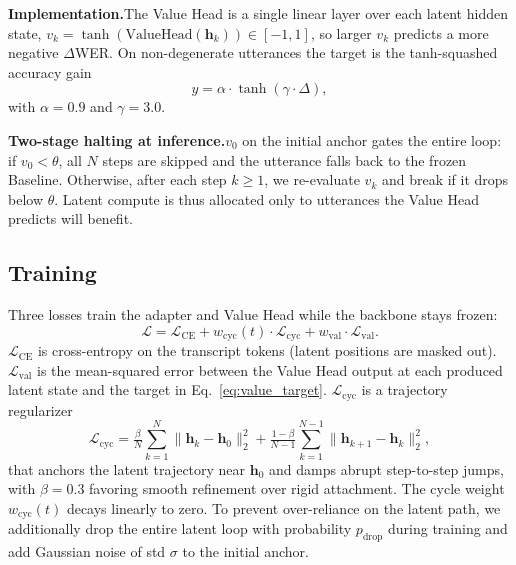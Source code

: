 \documentclass[a4paper]{article}
\begin{document}
\textbf{Implementation.}\quad The Value Head is a single linear layer over each latent hidden state, $v_k = \tanh(\text{ValueHead}(\mathbf{h}_k)) \in [-1, 1]$, so larger $v_k$ predicts a more negative $\Delta$WER. On non-degenerate utterances the target is the tanh-squashed accuracy gain
\begin{equation}
    y = \alpha \cdot \tanh(\gamma \cdot \Delta),
    \label{eq:value_target}
\end{equation}
with $\alpha{=}0.9$ and $\gamma{=}3.0$.

\textbf{Two-stage halting at inference.}\quad $v_0$ on the initial anchor gates the entire loop: if $v_0 < \theta$, all $N$ steps are skipped and the utterance falls back to the frozen Baseline. Otherwise, after each step $k\geq 1$, we re-evaluate $v_k$ and break if it drops below $\theta$. Latent compute is thus allocated only to utterances the Value Head predicts will benefit.

\subsection{Training}
\label{sec:training}

Three losses train the adapter and Value Head while the backbone stays frozen:
\begin{equation}
    \mathcal{L} = \mathcal{L}_{\text{CE}} + w_{\text{cyc}}(t) \cdot \mathcal{L}_{\text{cyc}} + w_{\text{val}} \cdot \mathcal{L}_{\text{val}}.
    \label{eq:loss_total}
\end{equation}
$\mathcal{L}_{\text{CE}}$ is cross-entropy on the transcript tokens (latent positions are masked out). $\mathcal{L}_{\text{val}}$ is the mean-squared error between the Value Head output at each produced latent state and the target in Eq.~\ref{eq:value_target}. $\mathcal{L}_{\text{cyc}}$ is a trajectory regularizer
\begin{equation}
\mathcal{L}_{\text{cyc}} = \tfrac{\beta}{N}\!\sum_{k=1}^{N}\!\lVert\mathbf{h}_k {-} \mathbf{h}_0\rVert_2^2 + \tfrac{1{-}\beta}{N{-}1}\!\sum_{k=1}^{N-1}\!\lVert\mathbf{h}_{k+1} {-} \mathbf{h}_k\rVert_2^2,
\label{eq:loss_cyc}
\end{equation}
that anchors the latent trajectory near $\mathbf{h}_0$ and damps abrupt step-to-step jumps, with $\beta{=}0.3$ favoring smooth refinement over rigid attachment. The cycle weight $w_{\text{cyc}}(t)$ decays linearly to zero. To prevent over-reliance on the latent path, we additionally drop the entire latent loop with probability $p_{\text{drop}}$ during training and add Gaussian noise of std $\sigma$ to the initial anchor.
\end{document}

